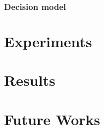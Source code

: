 \documentclass[10pt,a4paper,twocolumn]{article}
\begin{document}
\subsubsection{Decision model}



\section{Experiments}




\section{Results}




\section{Future Works}




\end{document}

